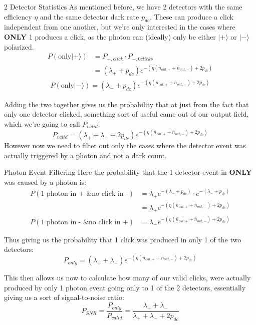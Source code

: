 \documentclass[aspectratio=169]{beamer}
\begin{document}
\begin{frame}{2 Detector Statistics}
    As mentioned before, we have 2 detectors with the same efficiency $\eta$ and the same detector dark rate $p_{dc}$. These can produce a click independent from one another, but we're only interested in the cases where \textbf{ONLY} 1 produces a click, as the photon can (ideally) only be either $|+\rangle$ or $|-\rangle$ polarized.
    \begin{align*}
        P(\text{only}|+\rangle) &= P_{+,click}\cdot P_{-,0 clicks}\\
                                &= (\lambda_{+} + p_{dc})e^{-(\eta(\bar{n}_{out,+} + \bar{n}_{out,-}) + 2p_{dc})}
    \end{align*}
    \begin{align*}
        P(\text{only}|-\rangle) = (\lambda_{-} + p_{dc})e^{-(\eta(\bar{n}_{out,+} + \bar{n}_{out,-}) + 2p_{dc})}
    \end{align*}

    Adding the two together gives us the probability that at just from the fact that only one detector clicked, something sort of useful came out of our output field, which we're going to call $P_{valid}$:
    $$
    P_{valid} = (\lambda_{+} + \lambda_{-} + 2p_{dc})e^{-(\eta(\bar{n}_{out,+}+\bar{n}_{out,-})+2p_{dc})}
    $$
    However now we need to filter out only the cases where the detector event was actually triggered by a photon and not a dark count.
\end{frame}
\begin{frame}{Photon Event Filtering}
    Here the probability that the 1 detector event in \textbf{ONLY} was caused by a photon is:
    \begin{align*}
        P(\text{1 photon in + \& no click in -}) &= \lambda_{+} e^{-(\lambda_{+} + p_{dc})} \cdot e^{-(\lambda_{-} + p_{dc})}\\
                                                 &= \lambda_{+} e^{-(\eta(\bar{n}_{out,+}+\bar{n}_{out,-})+2p_{dc})} \\
        P(\text{1 photon in - \& no click in +}) &=  \lambda_{-} e^{-(\eta(\bar{n}_{out,+}+\bar{n}_{out,-})+2p_{dc})}
    \end{align*}

    Thus giving us the probability that 1 click was produced in only 1 of the two detectors:
    $$ P_{only} = (\lambda_{+} + \lambda_{-}) e^{-(\eta(\bar{n}_{out,+}+\bar{n}_{out,-})+2p_{dc})}$$

    This then allows us now to calculate how many of our valid clicks, were actually produced by only 1 photon event going only to 1 of the 2 detectors, essentially giving us a sort of signal-to-noise ratio:
    $$
    P_{SNR} = \frac{P_{only}}{P_{valid}} = \frac{\lambda_{+} + \lambda_{-}}{\lambda_{+} + \lambda_{-} + 2p_{dc}}
    $$
\end{frame}
\end{document}

